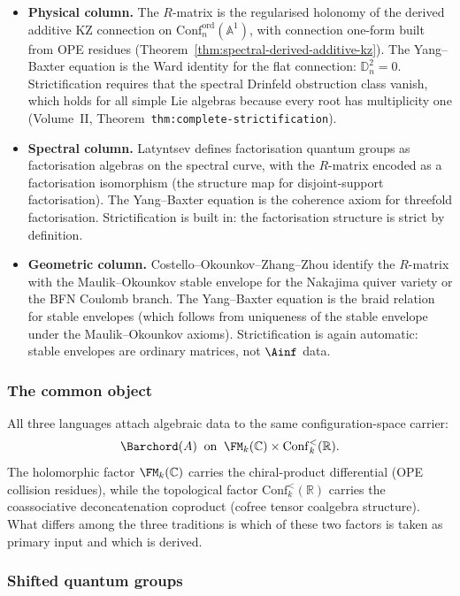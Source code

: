 \begin{itemize}
\item \textbf{Physical column.}
The $R$-matrix is the regularised holonomy of the derived additive KZ
connection on $\mathrm{Conf}_n^{\mathrm{ord}}(\mathbb{A}^1)$, with
connection one-form built from OPE residues
(Theorem~\ref{thm:spectral-derived-additive-kz}).
The Yang--Baxter equation is the Ward identity for the flat connection:
$\mathbb{D}_n^2=0$. Strictification requires that the spectral Drinfeld
obstruction class vanish, which holds for all simple Lie algebras because
every root has multiplicity one (Volume~II,
Theorem~\texttt{thm:complete-strictification}).

\item \textbf{Spectral column.}
Latyntsev defines factorisation quantum groups as factorisation algebras on
the spectral curve, with the $R$-matrix encoded as a factorisation
isomorphism (the structure map for disjoint-support factorisation). The
Yang--Baxter equation is the coherence axiom for threefold factorisation.
Strictification is built in: the factorisation structure is strict by
definition.

\item \textbf{Geometric column.}
Costello--Okounkov--Zhang--Zhou identify the $R$-matrix with the
Maulik--Okounkov stable envelope for the Nakajima quiver variety or the BFN
Coulomb branch. The Yang--Baxter equation is the braid relation for stable
envelopes (which follows from uniqueness of the stable envelope under the
Maulik--Okounkov axioms). Strictification is again automatic: stable
envelopes are ordinary matrices, not $\Ainf$ data.
\end{itemize}

\subsubsection*{The common object}

All three languages attach algebraic data to the same
configuration-space carrier:
\[
\Barchord(A)\;\;\text{on}\;\;
\FM_k(\mathbb{C})\times\mathrm{Conf}_k^<(\mathbb{R}).
\]
The holomorphic factor $\FM_k(\mathbb{C})$ carries the chiral-product
differential (OPE collision residues), while the topological factor
$\mathrm{Conf}_k^<(\mathbb{R})$ carries the coassociative deconcatenation
coproduct (cofree tensor coalgebra structure). What differs among the three traditions
is which of these two factors is taken as primary input and which
is derived.

\subsubsection*{Shifted quantum groups}

